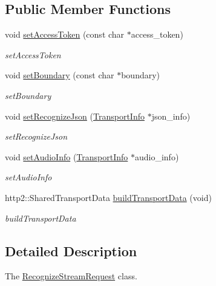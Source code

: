 \subsection*{Public Member Functions}
\begin{DoxyCompactItemize}
\item 
void \hyperlink{classAlexaEvent_1_1RecognizeStreamRequest_ade8ad7f62497adfd0799f176db7b8963}{set\+Access\+Token} (const char $\ast$access\+\_\+token)
\begin{DoxyCompactList}\small\item\em set\+Access\+Token \end{DoxyCompactList}\item 
void \hyperlink{classAlexaEvent_1_1RecognizeStreamRequest_a0ca0052d546cc3ce21d265029d7a7ba5}{set\+Boundary} (const char $\ast$boundary)
\begin{DoxyCompactList}\small\item\em set\+Boundary \end{DoxyCompactList}\item 
void \hyperlink{classAlexaEvent_1_1RecognizeStreamRequest_a118e9bb212b04d4bf8b2eea8800dcab4}{set\+Recognize\+Json} (\hyperlink{classAlexaEvent_1_1TransportInfo}{Transport\+Info} $\ast$json\+\_\+info)
\begin{DoxyCompactList}\small\item\em set\+Recognize\+Json \end{DoxyCompactList}\item 
void \hyperlink{classAlexaEvent_1_1RecognizeStreamRequest_a82ef05484d92a3bd9f63946125ae549d}{set\+Audio\+Info} (\hyperlink{classAlexaEvent_1_1TransportInfo}{Transport\+Info} $\ast$audio\+\_\+info)
\begin{DoxyCompactList}\small\item\em set\+Audio\+Info \end{DoxyCompactList}\item 
http2\+::\+Shared\+Transport\+Data \hyperlink{classAlexaEvent_1_1RecognizeStreamRequest_a3cfc29f048599f83b465eade796a4b5d}{build\+Transport\+Data} (void)
\begin{DoxyCompactList}\small\item\em build\+Transport\+Data \end{DoxyCompactList}\end{DoxyCompactItemize}


\subsection{Detailed Description}
The \hyperlink{classAlexaEvent_1_1RecognizeStreamRequest}{Recognize\+Stream\+Request} class. 

